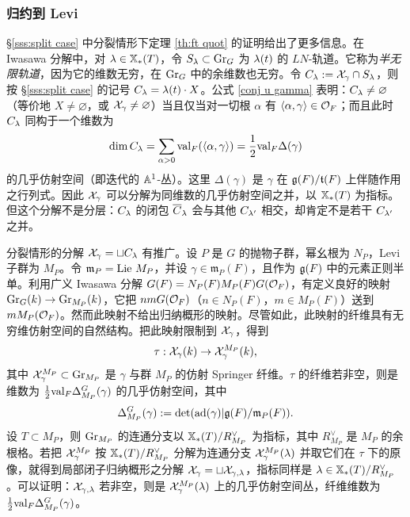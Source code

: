 \subsubsection{归约到 Levi} \S\ref{sss:split case} 中分裂情形下定理 \ref{th:ft quot} 的证明给出了更多信息。在 Iwasawa 分解中，对 $\l\in\xcoch(T)$，令 $S_{\l}\subset \Gr_{G}$ 为 $\l(t)$ 的 $LN$-轨道。它称为{\em 半无限轨道}，因为它的维数无穷，在 $\Gr_{G}$ 中的余维数也无穷。令 $C_{\l}:=\sX_{\gamma}\cap S_{\l}$，则按 \S\ref{sss:split case} 的记号 $C_{\l}=\l(t)\cdot X$。公式 \eqref{conj u gamma} 表明：$C_{\l}\neq\varnothing$（等价地 $X\neq\varnothing$，或 $\sX_{\gamma}\neq\varnothing$）当且仅当对一切根 $\alpha$ 有 $\jiao{\alpha,\gamma}\in\calO_{F}$；而且此时 $C_{\l}$ 同构于一个维数为
\begin{equation*}
\dim C_{\l}=\sum_{\alpha>0}\val_{F}(\jiao{\alpha,\gamma})=\frac{1}{2}\val_{F}\Delta(\gamma)
\end{equation*}
的几乎仿射空间（即迭代的 $\AA^{1}$-丛）。这里 $\Delta(\gamma)$ 是 $\gamma$ 在 $\frg(F)/\frt(F)$ 上伴随作用之行列式。因此 $\sX_{\gamma}$ 可以分解为同维数的几乎仿射空间之并，以 $\xcoch(T)$ 为指标。但这个分解不是分层：$C_{\l}$ 的闭包 $\ov{C}_{\l}$ 会与其他 $C_{\l'}$ 相交，却肯定不是若干 $C_{\l'}$ 之并。

分裂情形的分解 $\sX_{\gamma}=\sqcup C_{\l}$ 有推广。设 $P$ 是 $G$ 的抛物子群，幂幺根为 $N_{P}$，Levi 子群为 $M_{P}$。令 $\mathfrak{m}_{P}=\Lie M_{P}$，并设 $\gamma\in\mathfrak{m}_{P}(F)$，且作为 $\frg(F)$ 中的元素正则半单。利用广义 Iwasawa 分解 $G(F)=N_{P}(F)M_{P}(F)G(\calO_{F})$，有定义良好的映射 $\Gr_{G}(k)\to \Gr_{M_{P}}(k)$，它把 $nm G(\calO_{F})$（$n\in N_{P}(F)$，$m\in M_{P}(F)$）送到 $m M_{P}(\calO_{F})$。然而此映射不给出归纳概形的映射。尽管如此，此映射的纤维具有无穷维仿射空间的自然结构。把此映射限制到 $\sX_{\gamma}$，得到
\begin{equation*}
\tau: \sX_{\gamma}(k)\to \sX^{M_{P}}_{\gamma}(k),
\end{equation*}
其中 $\sX^{M_{P}}_{\gamma}\subset \Gr_{M_{P}}$ 是 $\gamma$ 与群 $M_{P}$ 的仿射 Springer 纤维。$\tau$ 的纤维若非空，则是维数为 $\frac{1}{2}\val_{F}\Delta^{G}_{M_{P}}(\gamma)$ 的几乎仿射空间，其中
\begin{equation}\label{Delta G L}
\Delta^{G}_{M_{P}}(\gamma):=\det(\ad(\gamma)|\frg(F)/\mathfrak{m}_{P}(F)).
\end{equation}
设 $T\subset M_{P}$，则 $\Gr_{M_{P}}$ 的连通分支以 $\xcoch(T)/R^{\vee}_{M_{P}}$ 为指标，其中 $R^{\vee}_{M_{P}}$ 是 $M_{P}$ 的余根格。若把 $\sX^{M_{P}}_{\gamma}$ 按 $\xcoch(T)/R^{\vee}_{M_{P}}$ 分解为连通分支 $\sX^{M_{P}}_{\gamma}(\l)$ 并取它们在 $\tau$ 下的原像，就得到局部闭子归纳概形之分解 $\sX_{\gamma}=\sqcup\sX_{\gamma,\l}$，指标同样是 $\l\in\xcoch(T)/R^{\vee}_{M_{P}}$。可以证明：$\sX_{\gamma,\l}$ 若非空，则是 $\sX^{M_{P}}_{\gamma}(\l)$ 上的几乎仿射空间丛，纤维维数为 $\frac{1}{2}\val_{F}\Delta^{G}_{M_{P}}(\gamma)$。

